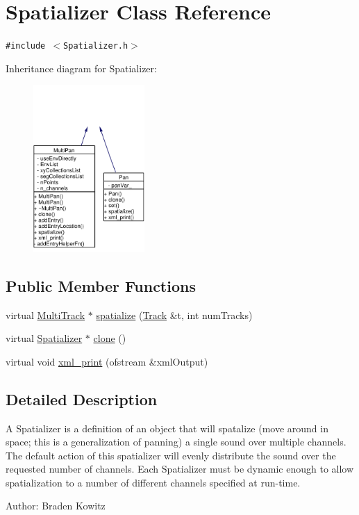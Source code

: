 \hypertarget{classSpatializer}{
\section{Spatializer Class Reference}
\label{classSpatializer}
}
{\tt \#include $<$Spatializer.h$>$}

Inheritance diagram for Spatializer:\begin{figure}[H]
\begin{center}
\leavevmode
\includegraphics[width=120pt]{classSpatializer__inherit__graph}
\end{center}
\end{figure}
\subsection*{Public Member Functions}
\begin{CompactItemize}
\item 
virtual \hyperlink{classMultiTrack}{Multi\-Track} $\ast$ \hyperlink{classSpatializer_a0}{spatialize} (\hyperlink{classTrack}{Track} \&t, int num\-Tracks)
\item 
virtual \hyperlink{classSpatializer}{Spatializer} $\ast$ \hyperlink{classSpatializer_a1}{clone} ()
\item 
virtual void \hyperlink{classSpatializer_a2}{xml\_\-print} (ofstream \&xml\-Output)
\end{CompactItemize}


\subsection{Detailed Description}
A Spatializer is a definition of an object that will spatalize (move around in space; this is a generalization of panning) a single sound over multiple channels. The default action of this spatializer will evenly distribute the sound over the requested number of channels. Each Spatializer must be dynamic enough to allow spatialization to a number of different channels specified at run-time. \begin{Desc}
\item[Author:]Braden Kowitz \end{Desc}




